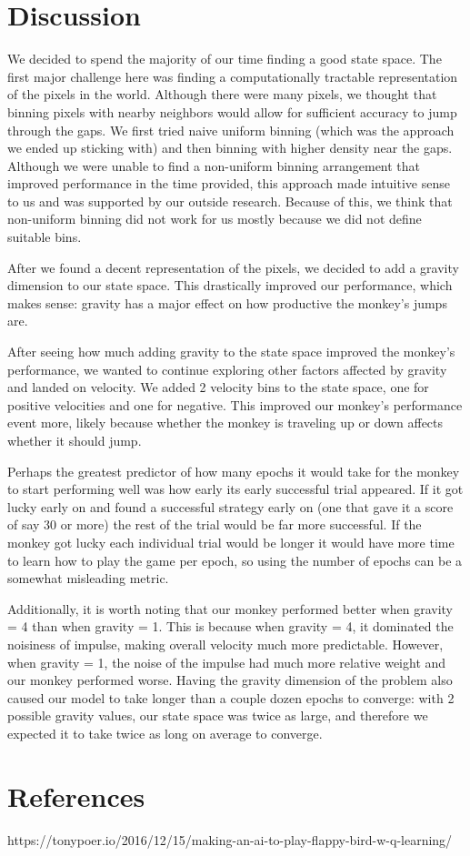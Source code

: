 \documentclass[11pt]{article}
\begin{document}
\section{Discussion} 

We decided to spend the majority of our time finding a good state space. The first major challenge here was finding a computationally tractable representation of the pixels in the world. Although there were many pixels, we thought that binning pixels with nearby neighbors would allow for sufficient accuracy to jump through the gaps. We first tried naive uniform binning (which was the approach we ended up sticking with) and then binning with higher density near the gaps. Although we were unable to find a non-uniform binning arrangement that improved performance in the time provided, this approach made intuitive sense to us and was supported by our outside research. Because of this, we think that non-uniform binning did not work for us mostly because we did not define suitable bins.

After we found a decent representation of the pixels, we decided to add a gravity dimension to our state space. This drastically improved our performance, which makes sense: gravity has a major effect on how productive the monkey's jumps are.

After seeing how much adding gravity to the state space improved the monkey's performance, we wanted to continue exploring other factors affected by gravity and landed on velocity. We added 2 velocity bins to the state space, one for positive velocities and one for negative. This improved our monkey's performance event more, likely because whether the monkey is traveling up or down affects whether it should jump.

Perhaps the greatest predictor of how many epochs it would take for the monkey to start performing well was how early its early successful trial appeared. If it got lucky early on and found a successful strategy early on (one that gave it a score of say 30 or more) the rest of the trial would be far more successful.  If the monkey got lucky each individual trial would be longer it would have more time to learn how to play the game per epoch, so using the number of epochs can be a somewhat misleading metric.

Additionally, it is worth noting that our monkey performed better when gravity = 4 than when gravity = 1. This is because when gravity = 4, it dominated the noisiness of impulse, making overall velocity much more predictable. However, when gravity = 1, the noise of the impulse had much more relative weight and our monkey performed worse. Having the gravity dimension of the problem also caused our model to take longer than a couple dozen epochs to converge: with 2 possible gravity values, our state space was twice as large, and therefore we expected it to take twice as long on average to converge.

\section{References}
https://tonypoer.io/2016/12/15/making-an-ai-to-play-flappy-bird-w-q-learning/
\end{document}
